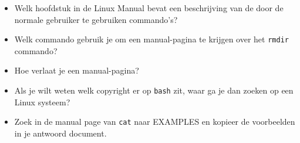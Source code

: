 \begin{itemize}
\item Welk hoofdstuk in de Linux Manual bevat een beschrijving van de door de normale gebruiker te gebruiken commando's?
\item Welk commando gebruik je om een manual-pagina te krijgen over het \texttt{rmdir} commando?
\item Hoe verlaat je een manual-pagina?
\item Als je wilt weten welk copyright er op \texttt{bash} zit, waar ga je dan zoeken op een Linux systeem?
\item Zoek in de manual page van \texttt{cat} naar EXAMPLES en kopieer de voorbeelden in je antwoord document.
\end{itemize}
